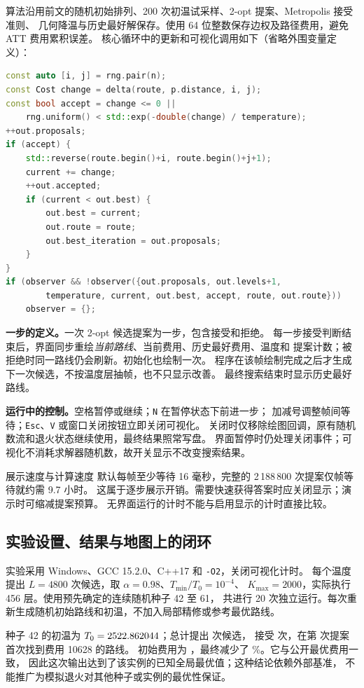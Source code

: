 算法沿用前文的随机初始排列、200 次初温试采样、2-opt 提案、Metropolis 接受准则、
几何降温与历史最好解保存。使用 64 位整数保存边权及路径费用，避免 ATT 费用累积误差。
核心循环中的更新和可视化调用如下（省略外围变量定义）：
\begin{lstlisting}[language=C++]
const auto [i, j] = rng.pair(n);
const Cost change = delta(route, p.distance, i, j);
const bool accept = change <= 0 ||
    rng.uniform() < std::exp(-double(change) / temperature);
++out.proposals;
if (accept) {
    std::reverse(route.begin()+i, route.begin()+j+1);
    current += change;
    ++out.accepted;
    if (current < out.best) {
        out.best = current;
        out.route = route;
        out.best_iteration = out.proposals;
    }
}
if (observer && !observer({out.proposals, out.levels+1,
        temperature, current, out.best, accept, route, out.route}))
    observer = {};
\end{lstlisting}

\textbf{一步的定义。}一次 2-opt 候选提案为一步，包含接受和拒绝。
每一步接受判断结束后，界面同步重绘\emph{当前路线}、当前费用、历史最好费用、温度和
提案计数；被拒绝时同一路线仍会刷新。初始化也绘制一次。
程序在该帧绘制完成之后才生成下一次候选，不按温度层抽帧，也不只显示改善。
最终搜索结束时显示历史最好路线。

\textbf{运行中的控制。}空格暂停或继续；\texttt{N} 在暂停状态下前进一步；
加减号调整帧间等待；\texttt{Esc}、\texttt{V} 或窗口关闭按钮立即关闭可视化。
关闭时仅移除绘图回调，原有随机数流和退火状态继续使用，最终结果照常写盘。
界面暂停时仍处理关闭事件；可视化不消耗求解器随机数，故开关显示不改变搜索结果。

\begin{keypoint}{展示速度与计算速度}
默认每帧至少等待 16 毫秒，完整的 2\,188\,800 次提案仅帧等待就约需 9.7 小时。
这属于逐步展示开销。需要快速获得答案时应关闭显示；演示时可缩减提案预算。
无界面运行的计时不能与启用显示的计时直接比较。
\end{keypoint}

\clearpage
\subsection{实验设置、结果与地图上的闭环}
实验采用 Windows、GCC 15.2.0、C++17 和 \texttt{-O2}，关闭可视化计时。
每个温度提出 $L=4800$ 次候选，取 $\alpha=0.98$、$T_{\min}/T_0=10^{-4}$、
$K_{\max}=2000$，实际执行 456 层。使用预先确定的连续随机种子 42 至 61，
共进行 20 次独立运行。每次重新生成随机初始路线和初温，不加入局部精修或参考最优路线。

种子 42 的初温为 $T_0=2522.862044$；总计提出 \AttProposals{} 次候选，
接受 \AttAccepted{} 次，在第 \AttFirstBest{} 次提案首次找到费用 10628 的路线。
初始费用为 \AttInitial，最终减少了 \AttReduction\%。它与公开最优费用一致，
因此这次输出达到了该实例的已知全局最优值；这种结论依赖外部基准，
不能推广为模拟退火对其他种子或实例的最优性保证。

